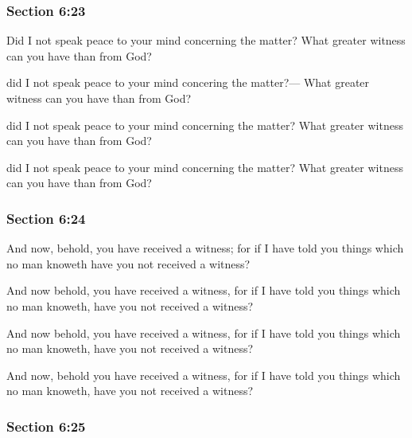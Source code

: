 	\subsubsection{Section 6:23} %
		\label{DC6-23}

		Did I not speak peace to your mind concerning the matter? What greater witness can you have than from God?

		\begin{framed}
		\scriptsize
			\begin{compactdesc}
				\item[JSP] did I not speak peace to your mind concering the matter?--- What greater witness can you have than from God?
				\item[DC 1835] did I not speak peace to your mind concerning the matter? What greater witness can you have than from God?
				\item[DC 1844] did I not speak peace to your mind concerning the matter? What greater witness can you have than from God? 
			\end{compactdesc}
		\end{framed}

	\subsubsection{Section 6:24} %
		\label{DC6-24}

		And now, behold, you have received a witness; for if I have told you things which no man knoweth have you not received a witness?

		\begin{framed}
		\scriptsize
			\begin{compactdesc}
				\item[JSP] And now behold, you have received a witness, for if I have told you things which no man knoweth, have you not received a witness?
				\item[DC 1835] And now behold, you have received a witness, for if I have told you things which no man knoweth, have you not received a witness?
				\item[DC 1844] And now, behold you have received a witness, for if I have told you things which no man knoweth, have you not received a witness? 
			\end{compactdesc}
		\end{framed}

	\subsubsection{Section 6:25} %
		\label{DC6-25}

